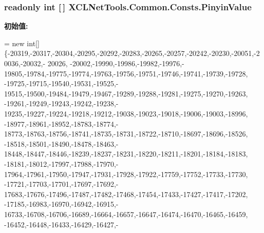 \hypertarget{class_x_c_l_net_tools_1_1_common_1_1_consts_ac245eab4dfd8a9a9769a223f8f10f86a}{
\subsubsection[{Pinyin\-Value}]{\setlength{\rightskip}{0pt plus 5cm}readonly int \mbox{[}$\,$\mbox{]} X\-C\-L\-Net\-Tools.\-Common.\-Consts.\-Pinyin\-Value\hspace{0.3cm}{\ttfamily [static]}}}\label{class_x_c_l_net_tools_1_1_common_1_1_consts_ac245eab4dfd8a9a9769a223f8f10f86a}
{\bfseries 初始值\-:}
\begin{DoxyCode}
= \textcolor{keyword}{new} \textcolor{keywordtype}{int}[]\{-20319,-20317,-20304,-20295,-20292,-20283,-20265,-20257,-20242,-20230,-20051,-20036,-20032,-
      20026,
                                                                    -20002,-19990,-19986,-19982,-19976,-
      19805,-19784,-19775,-19774,-19763,-19756,-19751,-19746,-19741,-19739,-19728,
                                                                    -19725,-19715,-19540,-19531,-19525,-
      19515,-19500,-19484,-19479,-19467,-19289,-19288,-19281,-19275,-19270,-19263,
                                                                    -19261,-19249,-19243,-19242,-19238,-
      19235,-19227,-19224,-19218,-19212,-19038,-19023,-19018,-19006,-19003,-18996,
                                                                    -18977,-18961,-18952,-18783,-18774,-
      18773,-18763,-18756,-18741,-18735,-18731,-18722,-18710,-18697,-18696,-18526,
                                                                    -18518,-18501,-18490,-18478,-18463,-
      18448,-18447,-18446,-18239,-18237,-18231,-18220,-18211,-18201,-18184,-18183,
                                                                    -18181,-18012,-17997,-17988,-17970,-
      17964,-17961,-17950,-17947,-17931,-17928,-17922,-17759,-17752,-17733,-17730,
                                                                    -17721,-17703,-17701,-17697,-17692,-
      17683,-17676,-17496,-17487,-17482,-17468,-17454,-17433,-17427,-17417,-17202,
                                                                    -17185,-16983,-16970,-16942,-16915,-
      16733,-16708,-16706,-16689,-16664,-16657,-16647,-16474,-16470,-16465,-16459,
                                                                    -16452,-16448,-16433,-16429,-16427,-

\end{DoxyCode}
